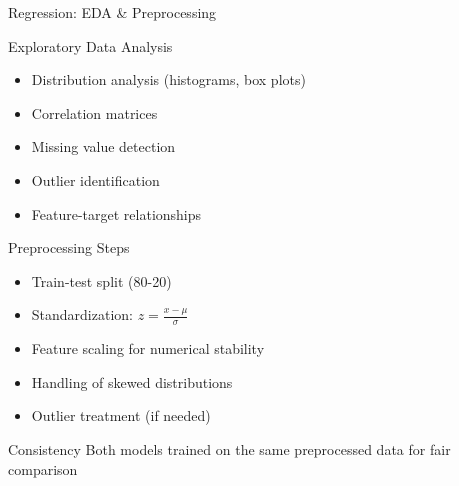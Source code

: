 \documentclass[aspectratio=169,10pt]{beamer}
\begin{document}
\begin{frame}{Regression: EDA \& Preprocessing}
\begin{block}{Exploratory Data Analysis}
\begin{itemize}
    \item Distribution analysis (histograms, box plots)
    \item Correlation matrices
    \item Missing value detection
    \item Outlier identification
    \item Feature-target relationships
\end{itemize}
\end{block}

\vspace{0.3cm}

\begin{block}{Preprocessing Steps}
\begin{itemize}
    \item Train-test split (80-20)
    \item Standardization: $z = \frac{x - \mu}{\sigma}$
    \item Feature scaling for numerical stability
    \item Handling of skewed distributions
    \item Outlier treatment (if needed)
\end{itemize}
\end{block}

\vspace{0.3cm}

\begin{alertblock}{Consistency}
Both models trained on the same preprocessed data for fair comparison
\end{alertblock}
\end{frame}
\end{document}
